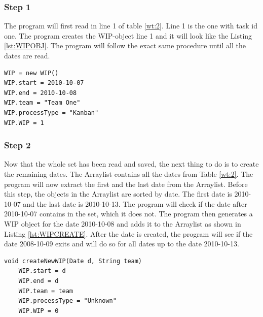 \documentclass[UKenglish]{ifimaster}  %
\begin{document}
\subsubsection{Step 1}
The program will first read in line 1 of table \ref{wt:2}.  Line 1 is the one with task id one.  The program creates the WIP-object line 1 and it will look like the Listing \ref{lst:WIPOBJ}.  The program will follow the exact same procedure until all the dates are read. 

\begin{minipage}{\textwidth} 
\begin{lstlisting}[caption={Creating WIP-object},label={lst:WIPOBJ}]
WIP = new WIP()
WIP.start = 2010-10-07
WIP.end = 2010-10-08
WIP.team = "Team One"
WIP.processType = "Kanban"
WIP.WIP = 1
\end{lstlisting}
  \end{minipage}

 \subsubsection{Step 2}
\label{sub:sub:st}
Now that the whole set has been read and saved, the next thing to do is to create the remaining dates. The Arraylist contains all the dates from Table \ref{wt:2}.  The program will now extract the first and the last date from the Arraylist. Before this step, the objects in the Arraylist are sorted by date. The first date is 2010-10-07 and the last date is 2010-10-13.  The program will check if the date after 2010-10-07 contains in the set, which it does not. The program then generates a WIP object for the date 2010-10-08 and adds it to the Arraylist as shown in Listing \ref{lst:WIPCREATE}. After the date is created, the program will see if the date 2008-10-09 exits and will do so for all dates up to the date 2010-10-13.

\begin{minipage}{\textwidth} 
\begin{lstlisting}[caption={Creating WIP-object},label={lst:WIPCREATE}]
void createNewWIP(Date d, String team) 
	WIP.start = d
	WIP.end = d
	WIP.team = team
	WIP.processType = "Unknown"
	WIP.WIP = 0
\end{lstlisting}
  \end{minipage}
\end{document}
